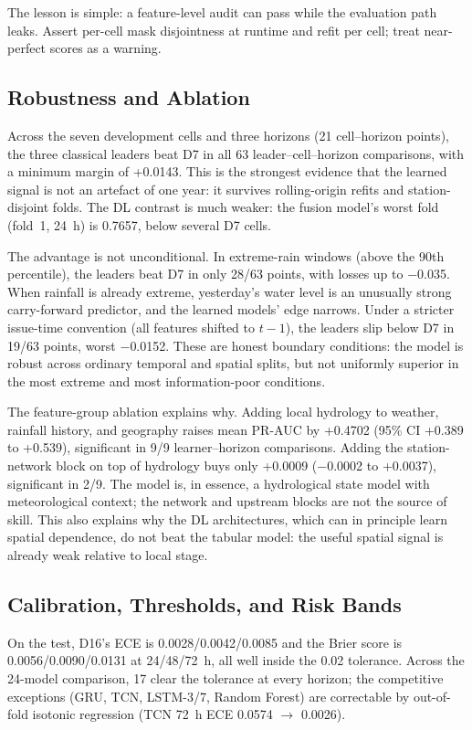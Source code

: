 \documentclass[conference]{IEEEtran}
\begin{document}
The lesson is simple: a feature-level audit can pass while the evaluation path leaks. Assert per-cell mask disjointness at runtime and refit per cell; treat near-perfect scores as a warning.

\subsection{Robustness and Ablation}

Across the seven development cells and three horizons (21 cell--horizon points), the three classical leaders beat D7 in all 63 leader--cell--horizon comparisons, with a minimum margin of +0.0143. This is the strongest evidence that the learned signal is not an artefact of one year: it survives rolling-origin refits and station-disjoint folds. The DL contrast is much weaker: the fusion model's worst fold (fold~1, 24~h) is 0.7657, below several D7 cells.

The advantage is not unconditional. In extreme-rain windows (above the 90th percentile), the leaders beat D7 in only 28/63 points, with losses up to $-$0.035. When rainfall is already extreme, yesterday's water level is an unusually strong carry-forward predictor, and the learned models' edge narrows. Under a stricter issue-time convention (all features shifted to $t-1$), the leaders slip below D7 in 19/63 points, worst $-$0.0152. These are honest boundary conditions: the model is robust across ordinary temporal and spatial splits, but not uniformly superior in the most extreme and most information-poor conditions.

The feature-group ablation explains why. Adding local hydrology to weather, rainfall history, and geography raises mean PR-AUC by +0.4702 (95\% CI +0.389 to +0.539), significant in 9/9 learner--horizon comparisons. Adding the station-network block on top of hydrology buys only +0.0009 ($-$0.0002 to +0.0037), significant in 2/9. The model is, in essence, a hydrological state model with meteorological context; the network and upstream blocks are not the source of skill. This also explains why the DL architectures, which can in principle learn spatial dependence, do not beat the tabular model: the useful spatial signal is already weak relative to local stage.

\subsection{Calibration, Thresholds, and Risk Bands}

On the test, D16's ECE is 0.0028/0.0042/0.0085 and the Brier score is 0.0056/0.0090/0.0131 at 24/48/72~h, all well inside the 0.02 tolerance. Across the 24-model comparison, 17 clear the tolerance at every horizon; the competitive exceptions (GRU, TCN, LSTM-3/7, Random Forest) are correctable by out-of-fold isotonic regression (TCN 72~h ECE 0.0574 $\rightarrow$ 0.0026).
\end{document}
